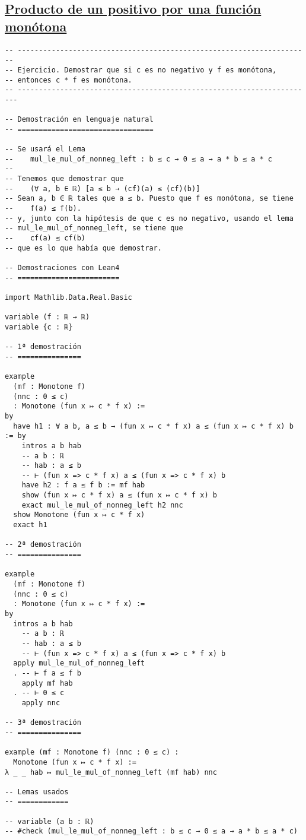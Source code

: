 \subsection{\href{./src/Logica/Producto\_de\_un\_positivo\_por\_una\_funcion\_monotona.lean}{Producto de un positivo por una función monótona}}
\label{sec:orgef7366a}
\begin{verbatim}
-- ---------------------------------------------------------------------
-- Ejercicio. Demostrar que si c es no negativo y f es monótona,
-- entonces c * f es monótona.
-- ----------------------------------------------------------------------

-- Demostración en lenguaje natural
-- ================================

-- Se usará el Lema
--    mul_le_mul_of_nonneg_left : b ≤ c → 0 ≤ a → a * b ≤ a * c
--
-- Tenemos que demostrar que
--    (∀ a, b ∈ ℝ) [a ≤ b → (cf)(a) ≤ (cf)(b)]
-- Sean a, b ∈ ℝ tales que a ≤ b. Puesto que f es monótona, se tiene
--    f(a) ≤ f(b).
-- y, junto con la hipótesis de que c es no negativo, usando el lema
-- mul_le_mul_of_nonneg_left, se tiene que
--    cf(a) ≤ cf(b)
-- que es lo que había que demostrar.

-- Demostraciones con Lean4
-- ========================

import Mathlib.Data.Real.Basic

variable (f : ℝ → ℝ)
variable {c : ℝ}

-- 1ª demostración
-- ===============

example
  (mf : Monotone f)
  (nnc : 0 ≤ c)
  : Monotone (fun x ↦ c * f x) :=
by
  have h1 : ∀ a b, a ≤ b → (fun x ↦ c * f x) a ≤ (fun x ↦ c * f x) b := by
    intros a b hab
    -- a b : ℝ
    -- hab : a ≤ b
    -- ⊢ (fun x => c * f x) a ≤ (fun x => c * f x) b
    have h2 : f a ≤ f b := mf hab
    show (fun x ↦ c * f x) a ≤ (fun x ↦ c * f x) b
    exact mul_le_mul_of_nonneg_left h2 nnc
  show Monotone (fun x ↦ c * f x)
  exact h1

-- 2ª demostración
-- ===============

example
  (mf : Monotone f)
  (nnc : 0 ≤ c)
  : Monotone (fun x ↦ c * f x) :=
by
  intros a b hab
    -- a b : ℝ
    -- hab : a ≤ b
    -- ⊢ (fun x => c * f x) a ≤ (fun x => c * f x) b
  apply mul_le_mul_of_nonneg_left
  . -- ⊢ f a ≤ f b
    apply mf hab
  . -- ⊢ 0 ≤ c
    apply nnc

-- 3ª demostración
-- ===============

example (mf : Monotone f) (nnc : 0 ≤ c) :
  Monotone (fun x ↦ c * f x) :=
λ _ _ hab ↦ mul_le_mul_of_nonneg_left (mf hab) nnc

-- Lemas usados
-- ============

-- variable (a b : ℝ)
-- #check (mul_le_mul_of_nonneg_left : b ≤ c → 0 ≤ a → a * b ≤ a * c)
\end{verbatim}

